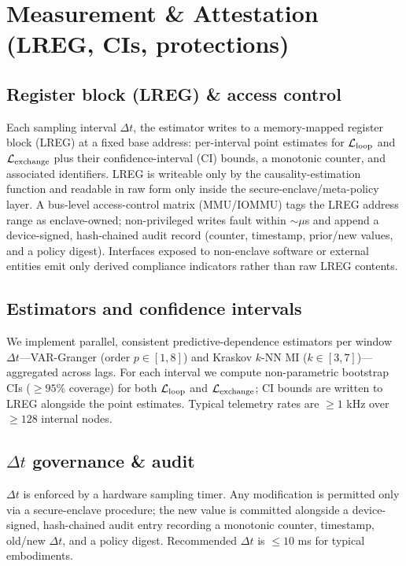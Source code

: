 \documentclass[11pt]{article}
\begin{document}
\appendix

\section{Measurement \& Attestation (LREG, CIs, protections)}
\label{sec:methods_appendix}

\subsection{Register block (LREG) \& access control}

Each sampling interval $\Delta t$, the estimator writes to a memory-mapped register block (LREG) at a fixed base address: per-interval point estimates for $\mathcal{L}_{\text{loop}}$ and $\mathcal{L}_{\text{exchange}}$ plus their confidence-interval (CI) bounds, a monotonic counter, and associated identifiers. LREG is writeable only by the causality-estimation function and readable in raw form only inside the secure-enclave/meta-policy layer. A bus-level access-control matrix (MMU/IOMMU) tags the LREG address range as enclave-owned; non-privileged writes fault within $\sim\mu$s and append a device-signed, hash-chained audit record (counter, timestamp, prior/new values, and a policy digest). Interfaces exposed to non-enclave software or external entities emit only derived compliance indicators rather than raw LREG contents.

\subsection{Estimators and confidence intervals}

We implement parallel, consistent predictive-dependence estimators per window $\Delta t$---VAR-Granger (order $p \in [1,8]$) and Kraskov $k$-NN MI ($k \in [3,7]$)---aggregated across lags. For each interval we compute non-parametric bootstrap CIs ($\geq 95\%$ coverage) for both $\mathcal{L}_{\text{loop}}$ and $\mathcal{L}_{\text{exchange}}$; CI bounds are written to LREG alongside the point estimates. Typical telemetry rates are $\geq 1$ kHz over $\geq 128$ internal nodes.

\subsection{$\Delta t$ governance \& audit}

$\Delta t$ is enforced by a hardware sampling timer. Any modification is permitted only via a secure-enclave procedure; the new value is committed alongside a device-signed, hash-chained audit entry recording a monotonic counter, timestamp, old/new $\Delta t$, and a policy digest. Recommended $\Delta t$ is $\leq 10$ ms for typical embodiments.
\end{document}
